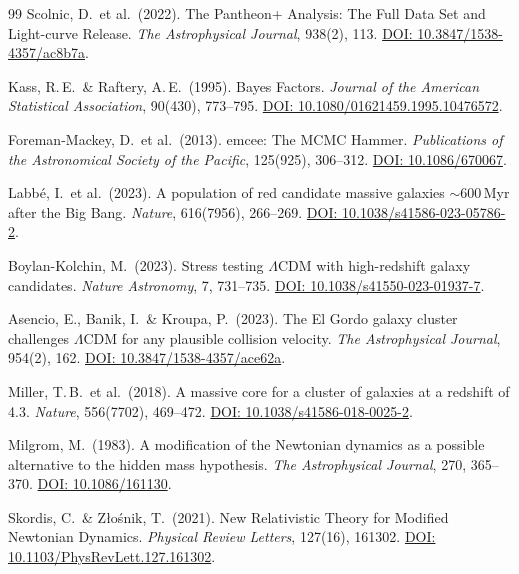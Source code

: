 \documentclass[aps,prd,twocolumn,superscriptaddress,nofootinbib]{revtex4-2}
\begin{document}
\begin{thebibliography}{99}
Scolnic, D.\ et al.\ (2022).
The Pantheon+ Analysis: The Full Data Set and Light-curve Release.
\textit{The Astrophysical Journal}, 938(2), 113.
\href{https://doi.org/10.3847/1538-4357/ac8b7a}{DOI: 10.3847/1538-4357/ac8b7a}.

Kass, R.\,E.\ \& Raftery, A.\,E.\ (1995).
Bayes Factors.
\textit{Journal of the American Statistical Association}, 90(430), 773--795.
\href{https://doi.org/10.1080/01621459.1995.10476572}{DOI: 10.1080/01621459.1995.10476572}.

Foreman-Mackey, D.\ et al.\ (2013).
emcee: The MCMC Hammer.
\textit{Publications of the Astronomical Society of the Pacific}, 125(925), 306--312.
\href{https://doi.org/10.1086/670067}{DOI: 10.1086/670067}.

Labb\'e, I.\ et al.\ (2023).
A population of red candidate massive galaxies $\sim$600\,Myr after the Big Bang.
\textit{Nature}, 616(7956), 266--269.
\href{https://doi.org/10.1038/s41586-023-05786-2}{DOI: 10.1038/s41586-023-05786-2}.

Boylan-Kolchin, M.\ (2023).
Stress testing $\Lambda$CDM with high-redshift galaxy candidates.
\textit{Nature Astronomy}, 7, 731--735.
\href{https://doi.org/10.1038/s41550-023-01937-7}{DOI: 10.1038/s41550-023-01937-7}.

Asencio, E., Banik, I.\ \& Kroupa, P.\ (2023).
The El Gordo galaxy cluster challenges $\Lambda$CDM for any plausible collision velocity.
\textit{The Astrophysical Journal}, 954(2), 162.
\href{https://doi.org/10.3847/1538-4357/ace62a}{DOI: 10.3847/1538-4357/ace62a}.

Miller, T.\,B.\ et al.\ (2018).
A massive core for a cluster of galaxies at a redshift of 4.3.
\textit{Nature}, 556(7702), 469--472.
\href{https://doi.org/10.1038/s41586-018-0025-2}{DOI: 10.1038/s41586-018-0025-2}.

Milgrom, M.\ (1983).
A modification of the Newtonian dynamics as a possible alternative to the hidden mass hypothesis.
\textit{The Astrophysical Journal}, 270, 365--370.
\href{https://doi.org/10.1086/161130}{DOI: 10.1086/161130}.

Skordis, C.\ \& Z{\l}o\'snik, T.\ (2021).
New Relativistic Theory for Modified Newtonian Dynamics.
\textit{Physical Review Letters}, 127(16), 161302.
\href{https://doi.org/10.1103/PhysRevLett.127.161302}{DOI: 10.1103/PhysRevLett.127.161302}.


\end{thebibliography}
\end{document}
